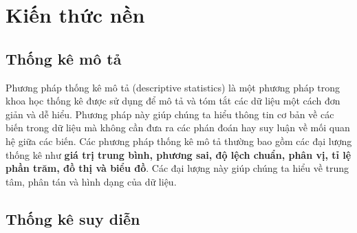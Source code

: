 \section{Kiến thức nền}
\subsection{Thống kê mô tả}
Phương pháp thống kê mô tả (descriptive statistics) là một phương pháp trong khoa học thống kê được sử dụng để mô tả và tóm tắt các dữ liệu một cách đơn giản và dễ hiểu. Phương pháp này giúp chúng ta hiểu thông tin cơ bản về các biến trong dữ liệu mà không cần đưa ra các phán đoán hay suy luận về mối quan hệ giữa các biến. Các phương pháp thống kê mô tả thường bao gồm các đại lượng thống kê như \textbf{giá trị trung bình, phương sai, độ lệch chuẩn, phân vị, tỉ lệ phần trăm, đồ thị và biểu đồ}. Các đại lượng này giúp chúng ta hiểu về trung tâm, phân tán và hình dạng của dữ liệu.
\subsection{Thống kê suy diễn}
\subsubsection{}